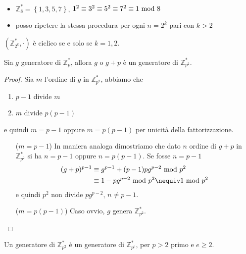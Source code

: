 \begin{esempio}\
	\begin{itemize}
		\item $\mathbb{Z}_8^*=\left\{1,3,5,7\right\}$, $1^2\equiv3^2\equiv5^2\equiv7^2\equiv1\ \mathrm{mod}\ 8$
		\item posso ripetere la stessa procedura per ogni $n=2^k$ pari con $k>2$
	\end{itemize}
\end{esempio}
\begin{teorema}
	$\left(\mathbb{Z}_{2^k}^*,\cdot\right)$ è ciclico se e solo se $k=1,2$.
\end{teorema}
\begin{teorema}
	Sia $g$ generatore di $\mathbb{Z}_p^*$, allora $g$ o $g+p$ è un generatore di $\mathbb{Z}_{p^2}^*$.
\end{teorema}
\begin{proof}
	Sia $m$ l'ordine di $g$ in $\mathbb{Z}_{p^2}^*$, abbiamo che
	\begin{enumerate}
		\item $p-1$ divide $m$
		\item $m$ divide $p(p-1)$
	\end{enumerate}
	e quindi $m=p-1$ oppure $m=p(p-1)$ per unicità della fattorizzazione.
	\begin{itemize}
		\item[($m=p-1$)] In maniera analoga dimostriamo che dato $n$ ordine di $g+p$ in $\mathbb{Z}_{p^2}^*$ si ha $n=p-1$ oppure $n=p(p-1)$. Se fosse $n=p-1$
		\begin{align*}
		(g+p)^{p-1}&\equiv g^{p-1}+(p-1)pg^{p-2}\Mod p^2\\ 
		&\equiv 1-pg^{p-2}\Mod p^2 \nequiv 1\Mod p^2
		\end{align*}
		e quindi $p^2$ non divide $pg^{p-2}$, $n\neq p-1$.
		\item[($m=p(p-1)$)] Caso ovvio, $g$ genera $\mathbb{Z}_{p^2}^*$.
	\end{itemize}
\end{proof}
\begin{teorema}
	Un generatore di $\mathbb{Z}_{p^2}^*$ è un generatore di $\mathbb{Z}_{p^e}^*$,  per $p > 2$ primo e $e\geq2$.
\end{teorema}
